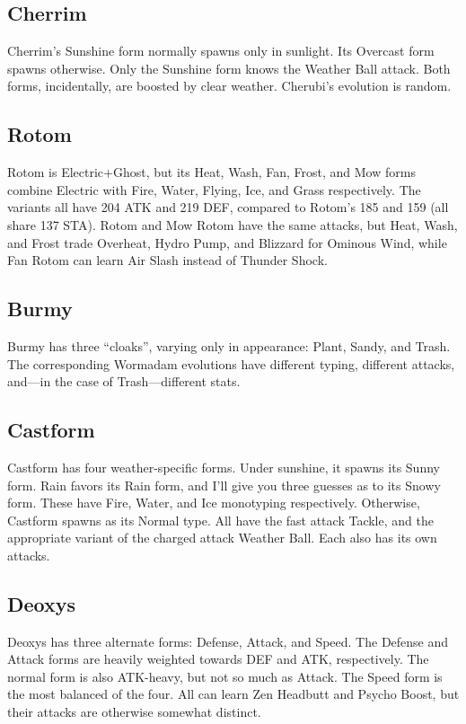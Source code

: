 \subsection{Cherrim}
Cherrim's Sunshine form normally spawns only in sunlight.
Its Overcast form spawns otherwise.
Only the Sunshine form knows the Weather Ball attack.
Both forms, incidentally, are boosted by clear weather.
Cherubi's evolution is random.

\subsection{Rotom}
Rotom is Electric+Ghost, but its Heat, Wash, Fan, Frost, and Mow forms combine
 Electric with Fire, Water, Flying, Ice, and Grass respectively.
The variants all have 204 ATK and 219 DEF, compared to Rotom's 185 and 159 (all share 137 STA).
Rotom and Mow Rotom have the same attacks, but Heat, Wash, and Frost
  trade Overheat, Hydro Pump, and Blizzard for Ominous Wind,
  while Fan Rotom can learn Air Slash instead of Thunder Shock.

\subsection{Burmy}
Burmy has three ``cloaks'', varying only in appearance: Plant, Sandy, and Trash.
The corresponding Wormadam evolutions have different typing, different attacks,
 and---in the case of Trash---different stats.

\subsection{Castform\label{subsec:castform}}
Castform has four weather-specific forms.
Under sunshine, it spawns its Sunny form.
Rain favors its Rain form, and I'll give you three guesses as to its Snowy form.
These have Fire, Water, and Ice monotyping respectively.
Otherwise, Castform spawns as its Normal type.
All have the fast attack Tackle, and the appropriate variant of the charged attack Weather Ball.
Each also has its own attacks.

\subsection{Deoxys\label{subsec:deoxys}}
Deoxys has three alternate forms: Defense, Attack, and Speed.
The Defense and Attack forms are heavily weighted towards DEF and ATK, respectively.
The normal form is also ATK-heavy, but not so much as Attack.
The Speed form is the most balanced of the four.
All can learn Zen Headbutt and Psycho Boost, but their attacks are otherwise somewhat distinct.

